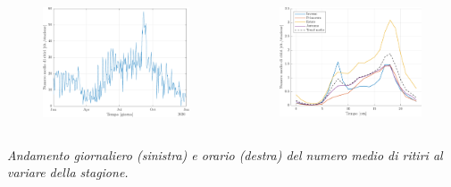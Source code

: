 \begin{frame}
	\centering
	\begin{columns}[T]
		\begin{column}[t]{0.48\linewidth}
			\centering
			\begin{figure}
				\includegraphics[width=\textwidth]{../Tesi/Immagini/4. Caso di studio/Serie storiche/Ritiri giornalieri}
			\end{figure}
		\end{column}
		\begin{column}[t]{0.48\linewidth}
			\centering
			\begin{figure}
				\includegraphics[width=\textwidth]{../Tesi/Immagini/4. Caso di studio/Serie storiche/Ritiri orari}
			\end{figure}
		\end{column}
	\end{columns}
	\vspace{5pt}
	\textit{Andamento giornaliero (sinistra) e orario (destra) del numero medio di ritiri al variare della stagione.}
\end{frame}

